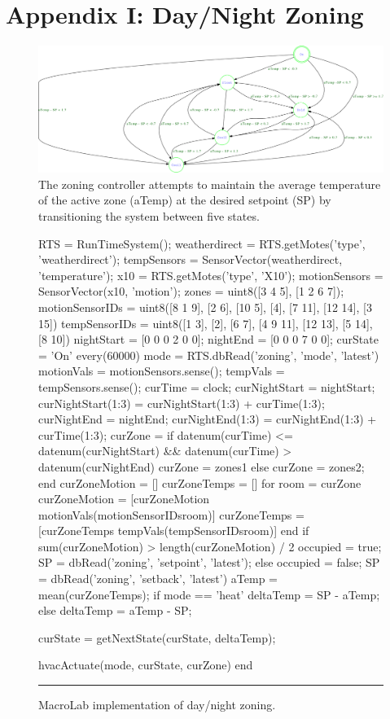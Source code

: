 \chapter{Appendix I: Day/Night Zoning}
\label{appendix:i}


\begin{figure}[ht]
  \centering
  \includegraphics[width=1.0\columnwidth]{fig/fsm.eps}
  \caption[Finite State Machine of Day/Night Zoning Controller]{The
  zoning controller attempts to maintain the average temperature of the active
  zone (aTemp) at the desired setpoint (SP) by transitioning the system between
  five states.}
  \label{fig:stateMachine}
\end{figure}


\begin{figure}
  \begin{macrolab}
RTS = RunTimeSystem();
weatherdirect = RTS.getMotes('type', 'weatherdirect');
tempSensors = SensorVector(weatherdirect, 'temperature');
x10 = RTS.getMotes('type', 'X10');
motionSensors = SensorVector(x10, 'motion');
zones = uint8({[3 4 5], [1 2 6 7]}); %
motionSensorIDs = uint8({[8 1 9], [2 6], [10 5], [4], [7 11], [12 14], [3 15]})
tempSensorIDs = uint8({[1 3], [2], [6 7], [4 9 11], [12 13], [5 14], [8 10]}) 
nightStart = [0 0 0 2 0 0];
nightEnd = [0 0 0 7 0 0];
curState = 'On'
every(60000)
  mode = RTS.dbRead('zoning', 'mode', 'latest')
  motionVals = motionSensors.sense();
  tempVals =  tempSensors.sense();
  curTime = clock;
  curNightStart = nightStart;
  curNightStart(1:3) = curNightStart(1:3) + curTime(1:3);
  curNightEnd = nightEnd;
  curNightEnd(1:3) = curNightEnd(1:3) + curTime(1:3);
  curZone = {}
  if datenum(curTime) <= datenum(curNightStart) && datenum(curTime) > datenum(curNightEnd)  
    curZone = zones{1}
  else
    curZone = zones{2};
  end
  curZoneMotion = []
  curZoneTemps = []
  for room = curZone
    curZoneMotion = [curZoneMotion motionVals(motionSensorIDs{room})]
    curZoneTemps = [curZoneTemps tempVals(tempSensorIDs{room})]
  end
  if sum(curZoneMotion) > length(curZoneMotion) / 2
    occupied = true;
    SP = dbRead('zoning', 'setpoint', 'latest');
  else
    occupied = false;
    SP = dbRead('zoning', 'setback', 'latest')
  aTemp = mean(curZoneTemps);
  if mode == 'heat'
    deltaTemp = SP - aTemp;
  else
    deltaTemp = aTemp - SP;

  curState = getNextState(curState, deltaTemp);

  hvacActuate(mode, curState, curZone)
end
  \end{macrolab}
  \smallskip
  \hrule width 1\columnwidth
  \caption{MacroLab implementation of day/night zoning.}
  \label{code:cs1}
\end{figure}


